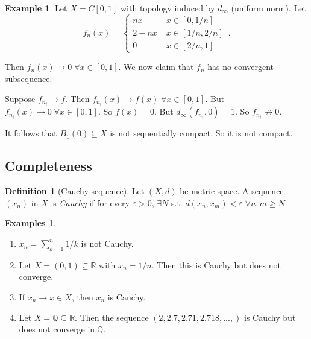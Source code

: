 \documentclass[a4paper,11pt]{article}
\theoremstyle{definition}
\newtheorem*{defn}{Definition}
\newtheorem*{ex}{Example}
\newtheorem*{exs}{Examples}
\numberwithin{equation}{section}
\begin{document}
\begin{ex}
Let $X=C[0,1]$ with topology induced by $d_{\infty}$ (uniform norm). Let
\[
f_n(x)=\left\{\begin{array}{ll}
    nx\qquad & x\in[0,1/n] \\
    2-nx & x\in[1/n,2/n]\\
    0 & x\in[2/n,1]
\end{array}\right.\,.
\]

\begin{figure}[h]
    \centering
\end{figure}

Then $f_n(x)\rightarrow0\;\forall x\in[0,1]$. We now claim that $f_n$ has no convergent subsequence.

Suppose $f_{n_i}\rightarrow f$. Then $f_{n_i}(x)\rightarrow f(x)\;\forall x\in[0,1]$. But $f_{n_i}(x)\rightarrow0\;\forall x\in[0,1]$. So $f(x)=0$. But $d_\infty(f_{n_i},0)=1$. So $f_{n_i}\not\rightarrow0$.

It follows that $B_1(0)\subseteq X$ is not sequentially compact. So it is not compact.
\end{ex}

\subsection{Completeness}
\begin{defn}[Cauchy sequence]
    Let $(X,d)$ be metric space. A sequence $(x_n)$ in $X$ is \emph{Cauchy} if for every $\varepsilon>0$, $\exists N$ s.t. $d(x_n,x_m)<\varepsilon\;\forall n,m\geq N$. 
\end{defn}

\begin{exs}
\leavevmode
\begin{enumerate}
    \item $x_n=\sum^n_{k=1}1/k$ is not Cauchy.
    \item Let $X=(0,1)\subseteq\mathbb{R}$ with $x_n=1/n$. Then this is Cauchy but does not converge.
    \item If $x_n\rightarrow x\in X$, then $x_n$ is Cauchy.
    \item Let $X=\mathbb{Q}\subseteq\mathbb{R}$. Then the sequence $(2,2.7,2.71,2.718,...,)$ is Cauchy but does not converge in $\mathbb{Q}$.
\end{enumerate}
\end{exs}
\end{document}
